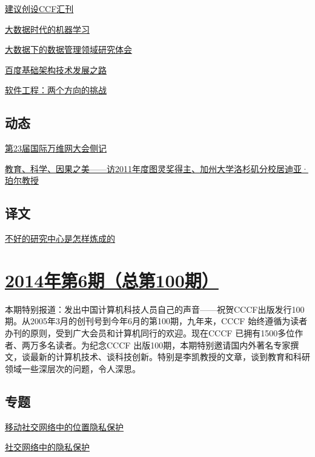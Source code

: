 \documentclass[a4paper]{article}
\begin{document}
\href{http://history.ccf.org.cn/resources/1190201776262/2014/07/14/9.pdf}{建议创设CCF汇刊}

\href{http://history.ccf.org.cn/resources/1190201776262/2014/07/14/13.pdf}{大数据时代的机器学习}

\href{http://history.ccf.org.cn/resources/1190201776262/2014/07/14/8.pdf}{大数据下的数据管理领域研究体会}

\href{http://history.ccf.org.cn/resources/1190201776262/2014/07/14/7.pdf}{百度基础架构技术发展之路}

\href{http://history.ccf.org.cn/resources/1190201776262/2014/07/14/12.pdf}{软件工程：两个方向的挑战}

\subsection{动态}
\href{http://history.ccf.org.cn/resources/1190201776262/2014/07/14/15.pdf}{第23届国际万维网大会侧记}

\href{http://history.ccf.org.cn/resources/1190201776262/2014/07/14/14.pdf}{教育、科学、因果之美——访2011年度图灵奖得主、加州大学洛杉矶分校居迪亚·珀尔教授}

\subsection{译文}
\href{http://history.ccf.org.cn/resources/1190201776262/2014/07/14/16.pdf}{不好的研究中心是怎样炼成的}


\section{\href{http://history.ccf.org.cn/sites/ccf/jsjtbbd.jsp?contentId=2804860852126}{\textbf{2014年第6期（总第100期）}}}
本期特别报道：发出中国计算机科技人员自己的声音——祝贺CCCF出版发行100期。从2005年3月的创刊号到今年6月的第100期，九年来，CCCF 始终遵循为读者办刊的原则，受到广大会员和计算机同行的欢迎。现在CCCF 已拥有1500多位作者、两万多名读者。为纪念CCCF 出版100期，本期特别邀请国内外著名专家撰文，谈最新的计算机技术、谈科技创新。特别是李凯教授的文章，谈到教育和科研领域一些深层次的问题，令人深思。
\subsection{专题}
\href{http://history.ccf.org.cn/resources/1190201776262/2014/06/13/10.pdf}{移动社交网络中的位置隐私保护}

\href{http://history.ccf.org.cn/resources/1190201776262/2014/06/13/5.pdf}{社交网络中的隐私保护}
\end{document}
